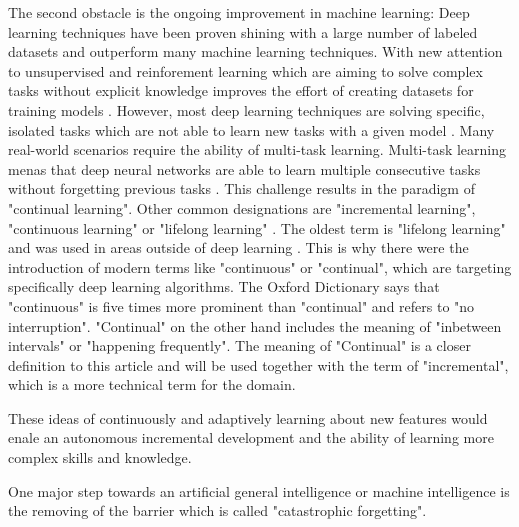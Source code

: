 The second obstacle is the ongoing improvement in machine learning:
\hfill \break
Deep learning techniques have been proven shining with a large number of labeled datasets and outperform many machine learning techniques.
With new attention to unsupervised and reinforement learning which are aiming to solve complex tasks without explicit knowledge improves the effort of creating datasets for training models \cite{continual-ai-blog, alphastar}.
However, most deep learning techniques are solving specific, isolated tasks which are not able to learn new tasks with a given model \cite{continual-ai-blog}.
Many real-world scenarios require the ability of multi-task learning.
Multi-task learning menas that deep neural networks are able to learn multiple consecutive tasks without forgetting previous tasks \cite{elastic-weight-consolidation}.
This challenge results in the paradigm of "continual learning".
Other common designations are "incremental learning", "continuous learning" or "lifelong learning" \cite{lifelong-machine-learning-book, continual-ai-blog}.
The oldest term is "lifelong learning" and was used in areas outside of deep learning \cite{continual-ai-blog}.
This is why there were the introduction of modern terms like "continuous" or "continual", which are targeting specifically deep learning algorithms.
\cite{continual-ai-blog}
The Oxford Dictionary says that "continuous" is five times more prominent than "continual" and refers to "no interruption". "Continual" on the other hand includes the meaning of "inbetween intervals" or "happening frequently".
\cite{oxford-continual-continuous}
The meaning of "Continual" is a closer definition to this article and will be used together with the term of "incremental", which is a more technical term for the domain.
\hfill \break



These ideas of continuously and adaptively learning about new features would enale an autonomous incremental development and the ability of learning more complex skills and knowledge.
\cite{continual-ai-blog}

One major step towards an artificial general intelligence or machine intelligence is the removing of the barrier which is called "catastrophic forgetting".

